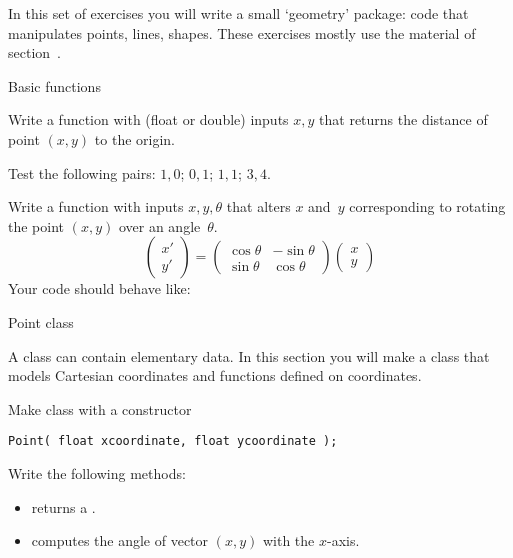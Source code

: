
In this set of exercises you will write a small `geometry' package:
code that manipulates points, lines, shapes.
These exercises mostly use the material of section~.

 {Basic functions}
\label{sec:geom-basic}

\begin{exercise}
  \label{ex:func-pointdistance}
  Write a function with (float or double) inputs $x,y$ that returns the distance of
  point $(x,y)$ to the origin.

  Test the following pairs: $1,0$; $0,1$; $1,1$; $3,4$.
\end{exercise}

\begin{exercise}
  \label{ex:pointrotate}
  Write a function with inputs $x,y,\theta$ that alters $x$ and~$y$
  corresponding to rotating the point $(x,y)$ over an angle~$\theta$.
  \[
  \begin{pmatrix}
    x'\\y'
  \end{pmatrix} =
  \begin{pmatrix}
    \cos\theta& -\sin\theta\\ \sin\theta&\cos\theta
  \end{pmatrix}
  \begin{pmatrix}
    x\\y
  \end{pmatrix}
  \]
  Your code should behave like:
\end{exercise}

 {Point class}
\label{ex:pointfunc}


A class can contain elementary data. In this section you will make a
 class that models Cartesian coordinates and functions
defined on coordinates.

\begin{exercise}
  \label{ex:geom:point}
  Make class  with a constructor
\begin{lstlisting}
Point( float xcoordinate, float ycoordinate );
\end{lstlisting}
Write the following methods:
\begin{itemize}
\item {} returns a .
\item {} computes the angle of vector $(x,y)$ with the $x$-axis.
\end{itemize}
\end{exercise}

